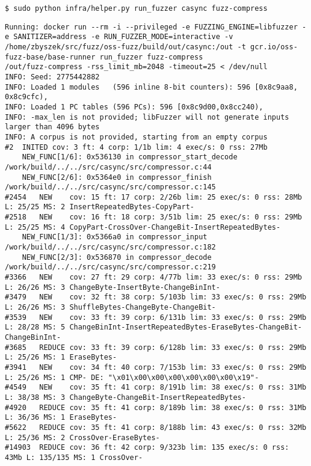 \documentclass[serif]{beamer}
\begin{document}
\begin{frame}[fragile]
  \tiny
  \begin{verbatim}
$ sudo python infra/helper.py run_fuzzer casync fuzz-compress
  \end{verbatim}
  \begin{verbatim}
Running: docker run --rm -i --privileged -e FUZZING_ENGINE=libfuzzer -e SANITIZER=address -e RUN_FUZZER_MODE=interactive -v /home/zbyszek/src/fuzz/oss-fuzz/build/out/casync:/out -t gcr.io/oss-fuzz-base/base-runner run_fuzzer fuzz-compress
/out/fuzz-compress -rss_limit_mb=2048 -timeout=25 < /dev/null
INFO: Seed: 2775442882
INFO: Loaded 1 modules   (596 inline 8-bit counters): 596 [0x8c9aa8, 0x8c9cfc), 
INFO: Loaded 1 PC tables (596 PCs): 596 [0x8c9d00,0x8cc240), 
INFO: -max_len is not provided; libFuzzer will not generate inputs larger than 4096 bytes
INFO: A corpus is not provided, starting from an empty corpus
#2	INITED cov: 3 ft: 4 corp: 1/1b lim: 4 exec/s: 0 rss: 27Mb
	NEW_FUNC[1/6]: 0x536130 in compressor_start_decode /work/build/../../src/casync/src/compressor.c:44
	NEW_FUNC[2/6]: 0x5364e0 in compressor_finish /work/build/../../src/casync/src/compressor.c:145
#2454	NEW    cov: 15 ft: 17 corp: 2/26b lim: 25 exec/s: 0 rss: 28Mb L: 25/25 MS: 2 InsertRepeatedBytes-CopyPart-
#2518	NEW    cov: 16 ft: 18 corp: 3/51b lim: 25 exec/s: 0 rss: 29Mb L: 25/25 MS: 4 CopyPart-CrossOver-ChangeBit-InsertRepeatedBytes-
	NEW_FUNC[1/3]: 0x5366a0 in compressor_input /work/build/../../src/casync/src/compressor.c:182
	NEW_FUNC[2/3]: 0x536870 in compressor_decode /work/build/../../src/casync/src/compressor.c:219
#3366	NEW    cov: 27 ft: 29 corp: 4/77b lim: 33 exec/s: 0 rss: 29Mb L: 26/26 MS: 3 ChangeByte-InsertByte-ChangeBinInt-
#3479	NEW    cov: 32 ft: 38 corp: 5/103b lim: 33 exec/s: 0 rss: 29Mb L: 26/26 MS: 3 ShuffleBytes-ChangeByte-ChangeBit-
#3539	NEW    cov: 33 ft: 39 corp: 6/131b lim: 33 exec/s: 0 rss: 29Mb L: 28/28 MS: 5 ChangeBinInt-InsertRepeatedBytes-EraseBytes-ChangeBit-ChangeBinInt-
#3685	REDUCE cov: 33 ft: 39 corp: 6/128b lim: 33 exec/s: 0 rss: 29Mb L: 25/26 MS: 1 EraseBytes-
#3941	NEW    cov: 34 ft: 40 corp: 7/153b lim: 33 exec/s: 0 rss: 29Mb L: 25/26 MS: 1 CMP- DE: "\x01\x00\x00\x00\x00\x00\x00\x19"-
#4549	NEW    cov: 35 ft: 41 corp: 8/191b lim: 38 exec/s: 0 rss: 31Mb L: 38/38 MS: 3 ChangeByte-ChangeBit-InsertRepeatedBytes-
#4920	REDUCE cov: 35 ft: 41 corp: 8/189b lim: 38 exec/s: 0 rss: 31Mb L: 36/36 MS: 1 EraseBytes-
#5622	REDUCE cov: 35 ft: 41 corp: 8/188b lim: 43 exec/s: 0 rss: 32Mb L: 25/36 MS: 2 CrossOver-EraseBytes-
#14903	REDUCE cov: 36 ft: 42 corp: 9/323b lim: 135 exec/s: 0 rss: 43Mb L: 135/135 MS: 1 CrossOver-

\end{verbatim}
\end{frame}
\end{document}
